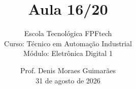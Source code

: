 
\title{Aula 16/20}

\subtitle{
\vspace{1.0cm}
Escola Tecnológica FPFtech\\
\vspace{0.5cm}
Curso: Técnico em Automação Industrial\\
\vspace{0.5cm}
Módulo: Eletrônica Digital 1
\vspace{1.0cm}
}

\author{
Prof. Denis Moraes Guimarães\\
\small 31 de agosto de 2026
}

\date{}